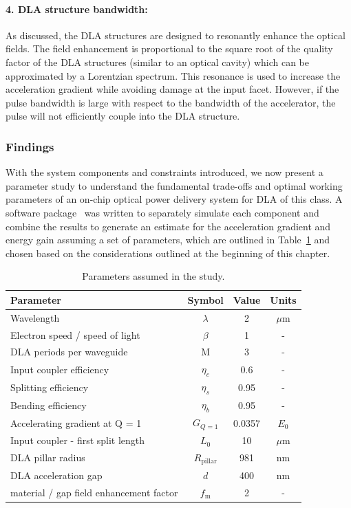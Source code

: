\paragraph{4. DLA structure bandwidth:}

As discussed, the DLA structures are designed to resonantly enhance the optical fields. The field enhancement is proportional to the square root of the quality factor of the DLA structures (similar to an optical cavity) which can be approximated by a Lorentzian spectrum.  This resonance is used to increase the acceleration gradient while avoiding damage at the input facet. However, if the pulse bandwidth is large with respect to the bandwidth of the accelerator, the pulse will not efficiently couple into the DLA structure.

\subsubsection{\label{sec:param}Findings}
With the system components and constraints introduced, we now present a parameter study to understand the fundamental trade-offs and optimal working parameters of an on-chip optical power delivery system for DLA of this class.  A software package~\cite{hughes2017github} was written to separately simulate each component and combine the results to generate an estimate for the acceleration gradient and energy gain assuming a set of parameters, which are outlined in Table~\ref{tab:params} and chosen based on the considerations outlined at the beginning of this chapter.

\begin{table}[htb]
\caption{\label{tab:params} Parameters assumed in the study.}
\centering
\begin{tabular}{lccc}
\hline
Parameter & Symbol & Value & Units \\
\hline
Wavelength & $\lambda$ & 2 & $\mu$m \\
Electron speed / speed of light & $\beta$ & 1 & - \\
DLA periods per waveguide & M & 3 & - \\
Input coupler efficiency & $\eta_c$ & 0.6 & - \\
Splitting efficiency & $\eta_s$ & 0.95 & - \\
Bending efficiency & $\eta_b$ & 0.95 & - \\
Accelerating gradient at Q = 1 & $G_{Q=1}$ & 0.0357 & $E_0$ \\
Input coupler - first split length & $L_0$ & 10 & $\mu$m \\
DLA pillar radius & $R_{\textrm{pillar}}$ & 981 & nm \\
DLA acceleration gap & $d$ & 400 & nm \\
material / gap field enhancement factor & $f_\textrm{m}$ & 2 & - \\
\hline
\end{tabular}
\end{table}

